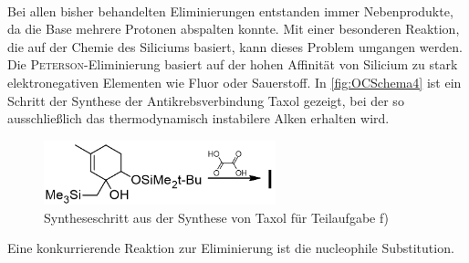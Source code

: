 \documentclass[../kl10.tex]{subfiles}
\begin{document}
\vspace{10pt}\\
Bei allen bisher behandelten Eliminierungen entstanden immer Nebenprodukte, da die Base mehrere Protonen abspalten konnte. Mit einer besonderen Reaktion, die auf der Chemie des Siliciums basiert, kann dieses Problem umgangen werden. Die \textsc{Peterson}-Eliminierung basiert auf der hohen Affinität von Silicium zu stark elektronegativen Elementen wie Fluor oder Sauerstoff. In \autoref{fig:OCSchema4} ist ein Schritt der Synthese der Antikrebsverbindung Taxol gezeigt, bei der so ausschließlich das thermodynamisch instabilere Alken erhalten wird.
\begin{figure}[H]
    \centering
    \includegraphics[width=0.6\textwidth]{2024/Abbildungen/Organik/Organik24_4.png}
    \caption{Syntheseschritt aus der Synthese von Taxol für Teilaufgabe f)}
    \label{fig:OCSchema4}
\end{figure}
\newpage

Eine konkurrierende Reaktion zur Eliminierung ist die nucleophile Substitution.
\end{document}
